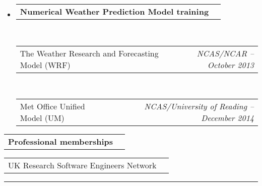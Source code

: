 \documentclass[10.5pt,a4]{article}
\makeatletter
\newcommand{\headerrow}[2]
{\begin{tabular*}{\linewidth}{l@{\extracolsep{\fill}}r}
	#1 &
	#2 \\
\end{tabular*}}
\makeatother
\begin{document}
\begin{itemize}
	\item 
	\headerrow
		{\textbf{Numerical Weather Prediction Model training}}
		{}
	\\
		\headerrow
		{The Weather Research and Forecasting Model (WRF)} 
		{\textit{NCAS/NCAR -- October 2013}}
  \\
		\headerrow
		{Met Office Unified Model (UM)}
		{\textit{NCAS/University of Reading -- December 2014}}
\end{itemize}

%

\begin{itemize*}
	\item 
	\headerrow
		{\textbf{Professional memberships}}
		{}
	\headerrow {UK Research Software Engineers Network}{}

\end{itemize*}

\hrule
\vspace{-0.4em}
\end{document}
